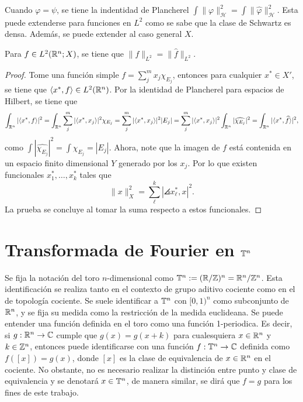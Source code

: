 \begin{remark}
	Cuando $\varphi=\psi$, se tiene la indentidad de Plancherel $\int \|\varphi\|_\mathcal{H}^2 = \int \|\widehat{\varphi}\|_\mathcal{H}^2$. Esta puede extenderse para funciones en $L^2$ como se sabe que la clase de Schwartz es densa. Además,  se puede extender al caso general $X$.
\end{remark}
\begin{theorem}
	Para $f\in L^2(\mathbb{R}^n;X)$, se tiene que $\|f\|_{L^2} = \|\widehat{f}\|_{L^2}$.
\end{theorem}
\begin{proof}
	Tome una función simple $f=\sum_j^m x_j \chi_{E_j}$, entonces para cualquier $x^*\in X'$, se tiene que $\langle x^*, f\rangle \in L^2(\mathbb{R}^n)$. Por la identidad de Plancherel para espacios de Hilbert, se tiene que
	\begin{equation*}
		\int_{\mathbb{R}^n} |\langle x^*, f\rangle|^2= \int_{\mathbb{R}^n} \sum_j^m |\langle x^*, x_j\rangle|^2\chi_{E_j}  = \sum_j^m |\langle x^*, x_j\rangle|^2|E_j| = \sum_j^m  |\langle x^*, x_j\rangle|^2 \int_{\mathbb{R}^n} |\widehat{\chi_{E_j}}|^2  = \int_{\mathbb{R}^n} |\langle x^*, \widehat{f}\rangle|^2  ,
	\end{equation*}
	como  $\int |\widehat{\chi_{E_j}}|^2 = \int \chi_{E_j }= |E_j|$. Ahora, note que la imagen de $f$ está contenida en un espacio finito dimensional $Y$ generado por los $x_j$. Por lo que existen funcionales $x^*_1, \ldots,x^*_k$ tales que 
	\begin{equation*}
		\|x\|_X^2 = \sum_\ell^k |\angles{x^*_\ell, x}|^2.
	\end{equation*}
	La prueba se concluye al tomar la suma respecto a estos funcionales.
\end{proof}
\section{Transformada de Fourier en $\mathbb{T}^n$}
Se fija la notación del toro $n$-dimensional como $\mathbb{T}^n:=(\mathbb{R}/\mathbb{Z})^n = \mathbb{R}^n/\mathbb{Z}^n$. Esta identificación se realiza tanto en el contexto de grupo aditivo cociente como en el de topología cociente. Se suele identificar a $\mathbb{T}^n$ con $[0, 1)^n$ como subconjunto de $\mathbb{R}^n$, y se fija su medida como la restricción de la medida euclideana. Se puede entender una función definida en el toro como una función 1-periodica. Es decir, si $g:\mathbb{R}^n\rightarrow\mathbb{C}$ cumple que $g(x)=g(x+k)$ para cualesquiera $x\in\mathbb{R}^n$ y $k\in\mathbb{Z}^n$, entonces puede identificarse con una función $f:\mathbb{T}^n\rightarrow\mathbb{C}$ definida como $f([x]) = g(x)$, donde $[x]$ es la clase de equivalencia de $x\in\mathbb{R}^n$ en el cociente. No obstante, no es necesario realizar la distinción entre punto y clase de equivalencia y se denotará $x\in\mathbb{T}^n$, de manera similar, se dirá que $f=g$ para los fines de este trabajo. 

